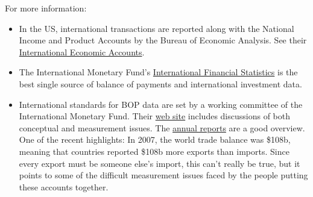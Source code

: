 For more information:
%
\begin{itemize}
\item In the US, international transactions are reported along with the National Income and
Product Accounts by the Bureau of Economic Analysis.  See their
\href{http://www.bea.gov/bea/di1.htm}{International Economic Accounts}.

\item The International Monetary Fund's
\href{http://elibrary-data.imf.org/finddatareports.aspx?d=33061&e=169393}{International Financial Statistics} is
the best single source of balance of payments and international investment data.

\item International standards for BOP data are set by a working committee of the International
Monetary Fund.  Their \href{http://www.imf.org/external/np/sta/bop/bop.htm}{web site} includes
discussions of both conceptual and measurement issues. The
\href{http://www.imf.org/external/bopage/arindex.htm}{annual reports} are a good overview.  One of
the recent highlights:  In 2007, the world trade balance was \$108b, meaning that countries
reported \$108b more exports than imports.  Since every export must be someone else's import, this
can't really be true, but it points to some of the difficult measurement issues faced by the
people putting these accounts together.

\end{itemize}


